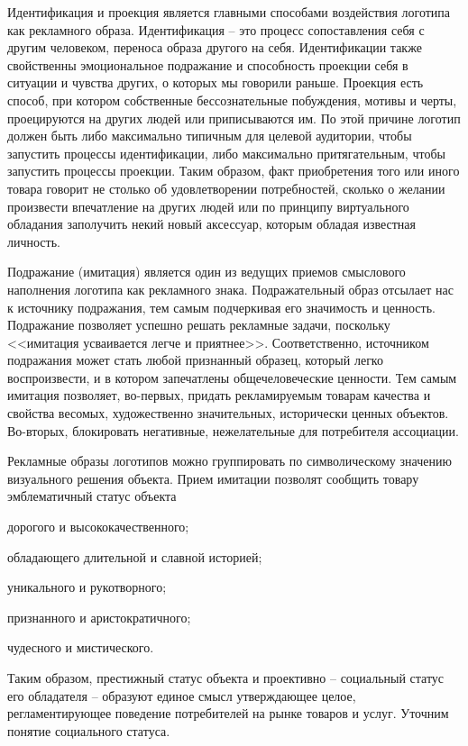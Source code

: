 Идентификация и проекция является главными способами воздействия логотипа как
рекламного образа. Идентификация -- это процесс сопоставления себя с другим
человеком, переноса образа другого на себя. Идентификации также свойственны
эмоциональное подражание и способность проекции себя в ситуации и чувства других,
о которых мы говорили раньше. Проекция есть способ, при котором собственные
бессознательные побуждения,  мотивы  и черты, проецируются на других людей
или приписываются им. По этой причине логотип должен быть либо максимально
типичным для целевой аудитории, чтобы запустить процессы идентификации, либо
максимально притягательным, чтобы запустить процессы проекции. Таким образом,
факт приобретения того или иного товара говорит не столько об удовлетворении
потребностей, сколько о желании произвести впечатление на других людей или по
принципу виртуального обладания заполучить некий новый аксессуар, которым обладая
известная личность.

Подражание (имитация) является один из ведущих приемов смыслового наполнения
логотипа как рекламного знака. Подражательный образ отсылает нас к источнику
подражания, тем самым подчеркивая его значимость и ценность. Подражание позволяет
успешно решать рекламные задачи, поскольку <<имитация усваивается легче и
приятнее>>.\autocite[][404]{lotman1998iskusstve} Соответственно, источником
подражания может стать любой признанный образец, который легко воспроизвести,
и в котором запечатлены общечеловеческие ценности. Тем самым имитация позволяет,
во-первых, придать рекламируемым товарам качества и свойства весомых,
художественно значительных, исторически ценных объектов. Во-вторых, блокировать
негативные, нежелательные для потребителя ассоциации.

Рекламные образы логотипов можно группировать по символическому значению
визуального решения
объекта.\autocite[][107]{pavlovskaya2003design} Прием имитации позволят сообщить
товару эмблематичный статус объекта
\begin{enumerate*}[label=\asbuk*)]
\item дорогого и высококачественного;
\item обладающего длительной и славной историей;
\item уникального и рукотворного;
\item признанного и аристократичного;
\item чудесного и мистического.
\end{enumerate*}
Таким образом, престижный статус объекта и проективно -- социальный статус его
обладателя -- образуют единое смысл утверждающее целое, регламентирующее
поведение потребителей на рынке товаров и услуг. Уточним понятие социального
статуса.

